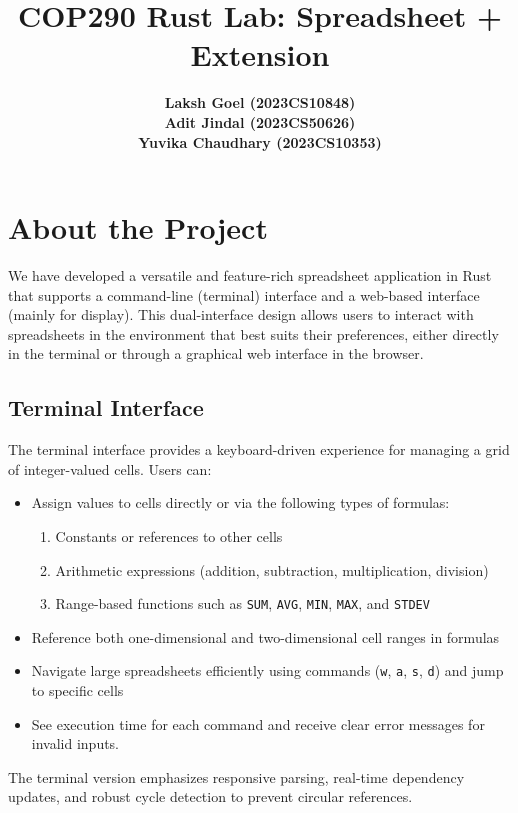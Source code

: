 \documentclass{article}
\begin{document}
\title{COP290 Rust Lab: Spreadsheet + Extension}
\author{\textbf{Laksh Goel (2023CS10848)} 
\\ \textbf{Adit Jindal (2023CS50626)} \\ \textbf{Yuvika Chaudhary (2023CS10353)}}
\maketitle
\section{About the Project}

We have developed a versatile and feature-rich spreadsheet application in Rust that supports a command-line (terminal) interface and a web-based interface (mainly for display). This dual-interface design allows users to interact with spreadsheets in the environment that best suits their preferences, either directly in the terminal or through a graphical web interface in the browser.
\subsection*{Terminal Interface}

The terminal interface provides a keyboard-driven experience for managing a grid of integer-valued cells. Users can:
\begin{itemize}
\item Assign values to cells directly or via the following types of formulas:
\begin{enumerate}
\item Constants or references to other cells
\item Arithmetic expressions (addition, subtraction, multiplication, division)
\item Range-based functions such as \texttt{SUM}, \texttt{AVG}, \texttt{MIN}, \texttt{MAX}, and \texttt{STDEV}
\end{enumerate}
\item Reference both one-dimensional and two-dimensional cell ranges in formulas
\item Navigate large spreadsheets efficiently using commands (\texttt{w}, \texttt{a}, \texttt{s}, \texttt{d}) and jump to specific cells
\item See execution time for each command and receive clear error messages for invalid inputs.
\end{itemize}
The terminal version emphasizes responsive parsing, real-time dependency updates, and robust cycle detection to prevent circular references.
\end{document}
